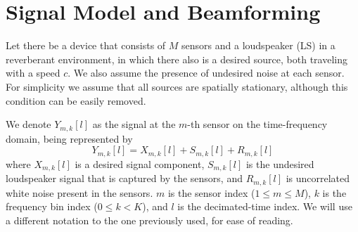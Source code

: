 \section{Signal Model and Beamforming}
\label{sec:signal_model}

Let there be a device that consists of $M$ sensors and a loudspeaker (LS) in a reverberant environment, in which there also is a desired source, both traveling with a speed $c$. We also assume the presence of undesired noise at each sensor. For simplicity we assume that all sources are spatially stationary, although this condition can be easily removed.

We denote $Y_{m,k}[l]$ as the signal at the $m$-th sensor on the time-frequency domain, being represented by
\begin{equation}
	\label{eq:sec3:system_time-freq_domain_base}
	Y_{m,k}[l] = X_{m,k}[l] + S_{m,k}[l] + R_{m,k}[l]
\end{equation}
where $X_{m,k}[l]$ is a desired signal component, $S_{m,k}[l]$ is the undesired loudspeaker signal that is captured by the sensors, and $R_{m,k}[l]$ is uncorrelated white noise present in the sensors. $m$ is the sensor index ($1 \leq m \leq M$), $k$ is the frequency bin index ($0 \leq k < K$), and $l$ is the decimated-time index. We will use a different notation to the one previously used, for ease of reading.

